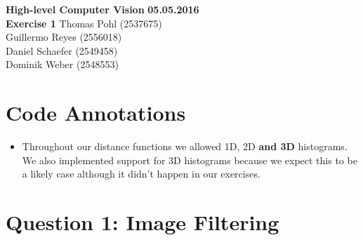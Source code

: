 \documentclass[12pt]{article}
\begin{document}

\noindent
{\Large \textbf{High-level Computer Vision}} \hfill \textbf{05.05.2016}\\
{\Large \textbf{Exercise 1}} \hfill Thomas Pohl (2537675)\\
\raggedleft \hfill Guillermo Reyes (2556018)\\
\hfill Daniel Schaefer (2549458)\\
\hfill Dominik Weber (2548553)\\

\raggedright


\section*{Code Annotations}

\begin{itemize}
    \item 
        Throughout our distance functions we allowed 1D, 2D \textbf{and 3D} histograms. We also implemented support for 3D histograms because we expect this to be a likely case although it didn't happen in our exercises.
\end{itemize}


\section*{Question 1: Image Filtering}
\end{document}
